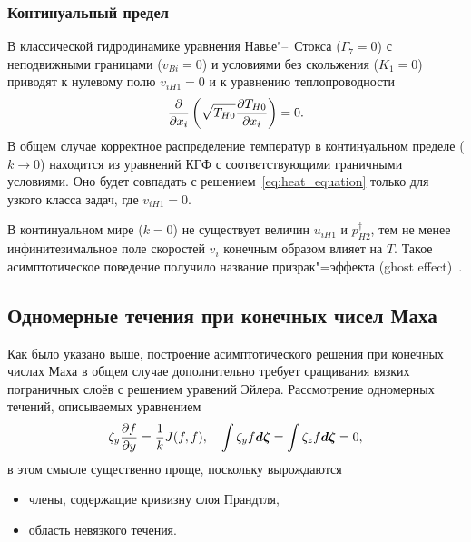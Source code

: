 \subsubsection{Континуальный предел}

В классической гидродинамике уравнения Навье"--~Стокса (\(\Gamma_7=0\))
с неподвижными границами (\(v_{Bi}=0\)) и условиями без скольжения (\(K_1=0\))
приводят к нулевому полю \(v_{iH1}=0\) и к уравнению теплопроводности
\begin{equation}\label{eq:heat_equation}
    \pder{x_i}\left(\sqrt{T_{H0}}\pder[T_{H0}]{x_i}\right) = 0.
\end{equation}
В общем случае корректное распределение температур в континуальном пределе (\(k\to0\))
находится из уравнений КГФ с соответствующими граничными условиями.
Оно будет совпадать с решением~\eqref{eq:heat_equation} только для узкого класса задач, где \(v_{iH1}=0\).

В континуальном мире (\(k=0\)) не существует величин \(u_{iH1}\) и \(p_{H2}^\dag\),
тем не менее инфинитезимальное поле скоростей \(v_i\) конечным образом влияет на \(T\).
Такое асимптотическое поведение получило название призрак"=эффекта (ghost effect)~\cite{Sone2002, Sone2007}.

\subsection{Одномерные течения при конечных чисел Маха}

Как было указано выше, построение асимптотического решения при конечных числах Маха в общем случае
дополнительно требует сращивания вязких пограничных слоёв с решением уравений Эйлера.
Рассмотрение одномерных течений, описываемых уравнением
\begin{equation}\label{eq:1d}
    \zeta_y\pder[f]{y} = \frac1kJ(f,f), \quad \int\zeta_yf\dzeta = \int\zeta_zf\dzeta = 0,
\end{equation}
в этом смысле существенно проще, поскольку вырождаются
\begin{itemize}
    \item члены, содержащие кривизну слоя Прандтля,
    \item область невязкого течения.
\end{itemize}

